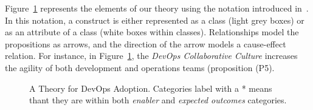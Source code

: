 Figure~\ref{fig:theory} represents the elements of our theory using the
notation introduced in~\cite{sjoberg2008}. In this notation,
a construct is either represented as a class (light grey
boxes) or as an attribute of a class (white boxes within classes).
Relationships model the propositions as arrows, and the direction
of the arrow models a cause-effect relation. For instance,
in Figure~\ref{fig:theory}, the \emph{DevOps Collaborative Culture}
increases the agility of both development and operations teams
(proposition (P5).


\begin{figure}[htb]
  \caption{A Theory for DevOps Adoption. Categories label with a * means
    thant they are within both \emph{enabler} and \emph{expected
    outcomes} categories.}
  \label{fig:theory} 
\end{figure}



